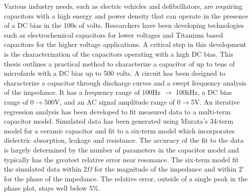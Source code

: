 \label{sec:abstract}
Various industry needs, such as electric vehicles and defibrillators, are requiring capacitors with a high energy and power density that can operate in the presence of a DC bias in the 100s of volts. Researchers have been developing technologies such as electrochemical capacitors for lower voltages and Titanium based capacitors for the higher voltage applications. A critical step in this development is the characterization of the capacitors operating with a high DC bias.
This thesis outlines a practical method to characterize a capacitor of up to tens of microfards with a DC bias up to 500 volts. A circuit has been designed to characterize a capacitor through discharge curves and a swept frequency analysis of the impedance. It has a frequency range of 100Hz $\rightarrow$ 100kHz, a DC bias range of 0$\rightarrow$500V, and an AC signal amplitude range of 0$\rightarrow$5V.
An iterative regression analysis has been developed to fit measured data to a multi-term capacitor model. Simulated data has been generated using Murata’s 34-term model for a ceramic capacitor and fit to a six-term model which incorporates dielectric absorption, leakage and resistance. The accuracy of the fit to the data is largely determined by the number of parameters in the capacitor model and typically has the greatest relative error near resonance. The six-term model fit the simulated data within $2 \Omega$ for the magnitude of the impedance and within $2^{\circ}$ for the phase of the impedance. The relative error, outside of a single peak in the phase plot, stays well below $5\%$.
